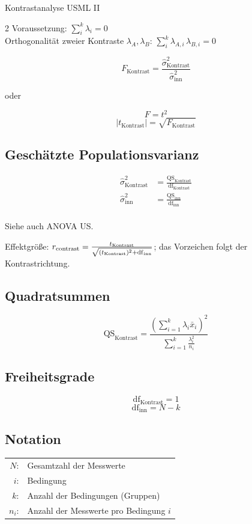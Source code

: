 \begin{formulaBox}{Kontrastanalyse US}{ML II}
\begin{multicols}{2}
Voraussetzung: $\sum\limits_{i}^{k}\lambda_i = 0$\\
Orthogonalität zweier Kontraste $\lambda_A,\lambda_B$: $\sum\limits_{i}^{k}\lambda_{A,i}\,\lambda_{B,i} = 0$

$$F_{\mathrm{Kontrast}}=\frac{\hat{\sigma}^2_{\mathrm{Kontrast}}}{\hat{\sigma}^2_{\mathrm{inn}}}$$ 
\begin{center}
    oder
\end{center}
$$F=t^2$$
$$|t_{\mathrm{Kontrast}}|=\sqrt{F_{\mathrm{Kontrast}}}$$
\subsection*{Geschätzte Populationsvarianz}

\begin{align*}
\hat{\sigma}^2_{\mathrm{Kontrast}}&=\frac{\mathrm{QS}_{\mathrm{Kontrast}}}{\mathrm{df}_{\mathrm{Kontrast}}}\\
\hat{\sigma}^2_{\mathrm{inn}}&=\frac{\mathrm{QS}_\mathrm{inn}}{\mathrm{df}_\mathrm{inn}}\\
\end{align*}

Siehe auch ANOVA US.
\par Effektgröße: $r_{\mathrm{contrast}}=\frac{t_{\mathrm{Kontrast}}}{\sqrt{(t_{\mathrm{Kontrast}})^2+\mathrm{df}_{\mathrm{inn}}}}$; das Vorzeichen folgt der Kontrastrichtung.

\subsection*{Quadratsummen}
$$\mathrm{QS}_{\mathrm{Kontrast}}=\frac{\left(\sum\limits_{i=1}^k \lambda_i\bar{x}_i\right)^2}{\sum\limits_{i=1}^k \frac{\lambda_i^2}{n_i}}$$
\subsection*{Freiheitsgrade}
$$\mathrm{df}_{\mathrm{Kontrast}}=1$$
$$\mathrm{df}_{\mathrm{inn}}=N-k$$

\subsection*{Notation}
\begin{tabular}{rl}
$N$: &Gesamtzahl der Messwerte\\
$i$: & Bedingung\\
$k$: &Anzahl der Bedingungen (Gruppen)\\
$n_i$: &Anzahl der Messwerte pro Bedingung $i$\\
\end{tabular}
\end{multicols}
\end{formulaBox}

